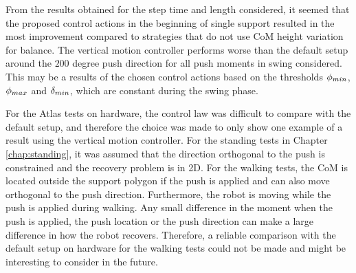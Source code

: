 From the results obtained for the step time and length considered, it seemed that the proposed control actions in the beginning of single support resulted in the most improvement compared to strategies that do not use \ac{CoM} height variation for balance. The vertical motion controller performs worse than the default setup around the $200$ degree push direction for all push moments in swing considered. This may be a results of the chosen control actions based on the thresholds $\phi_{min}$, $\phi_{max}$ and $\delta_{min}$, which are constant during the swing phase.

For the Atlas tests on hardware, the control law was difficult to compare with the default setup, and therefore the choice was made to only show one example of a result using the vertical motion controller. For the standing tests in Chapter \ref{chap:standing}, it was assumed that the direction orthogonal to the push is constrained and the recovery problem is in \ac{2D}. For the walking tests, the \ac{CoM} is located outside the support polygon if the push is applied and can also move orthogonal to the push direction. Furthermore, the robot is moving while the push is applied during walking. Any small difference in the moment when the push is applied, the push location or the push direction can make a large difference in how the robot recovers. Therefore, a reliable comparison with the default setup on hardware for the walking tests could not be made and might be interesting to consider in the future. 

